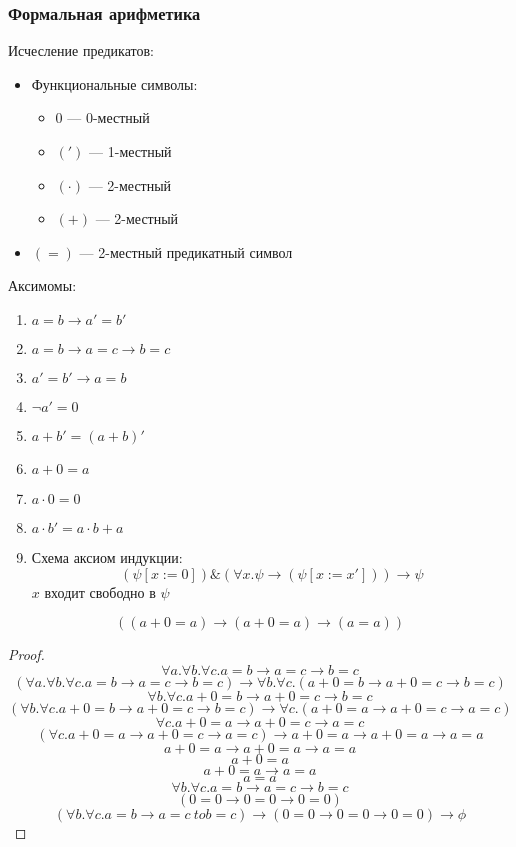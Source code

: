 \documentclass[english]{article}
\begin{document}
\subsubsection{Формальная арифметика}
\label{sec:orgeea56b7}
\begin{definition}
	Исчесление предикатов:
	\begin{itemize}
		\item Функциональные символы:
		      \begin{itemize}
			      \item \(0\) --- 0-местный
			      \item \((')\) --- 1-местный
			      \item \((\cdot)\) --- 2-местный
			      \item \((+)\) --- 2-местный
		      \end{itemize}
		\item \((=)\) --- 2-местный предикатный символ
	\end{itemize}
	Аксимомы:
	\begin{enumerate}
		\item \(a = b \to a' = b'\)
		\item \(a = b \to a = c \to b = c\)
		\item \(a' = b' \to a= b\)
		\item \(\neg a' = 0\)
		\item \(a + b' = (a + b)'\)
		\item \(a + 0 = a\)
		\item \(a\cdot 0 = 0\)
		\item \(a\cdot b' = a\cdot b + a\)
		\item Схема аксиом индукции:
		      \[ (\psi[x:=0])\&(\forall x. \psi \to (\psi[x:=x'])) \to \psi \]
		      \(x\) входит свободно в \(\psi\)
	\end{enumerate}
\end{definition}
\beginproperty
\begin{property}
	\[ ((a + 0 = a) \to (a + 0 = a) \to (a = a)) \]
\end{property}
\begin{proof}
	\[ \forall a. \forall b. \forall c. a = b \to a = c \to b = c \]
	\[ (\forall a. \forall b. \forall c. a = b \to a = c \to b = c) \to \forall b. \forall c. (a + 0 = b \to a + 0 = c \to b = c) \]
	\[ \forall b. \forall c. a + 0 = b \to a + 0 = c\to b = c \]
	\[ (\forall b. \forall c. a + 0 = b \to a + 0 = c \to b = c) \to \forall c.(a + 0 = a \to a + 0 = c \to a=c) \]
	\[ \forall c. a + 0 = a \to a + 0 = c \to a = c \]
	\[ (\forall c. a + 0 = a \to a + 0 = c \to a = c) \to a+0 = a \to a + 0 = a \to a= a \]
	\[ a + 0  = a \to a + 0 = a \to a = a \]
	\[ a + 0 = a \]
	\[ a + 0 = a \to a = a \]
	\[ a = a \]
	\[ \forall b. \forall c. a = b \to a = c \to b = c \]
	\[ (0 = 0 \to 0 = 0 \to 0 = 0) \]
	\[ (\forall b. \forall c. a = b \to a = c\ to b = c) \to (0 = 0 \to 0 = 0 \to 0 = 0) \to \phi \]
	\fixme
\end{proof}
\end{document}
